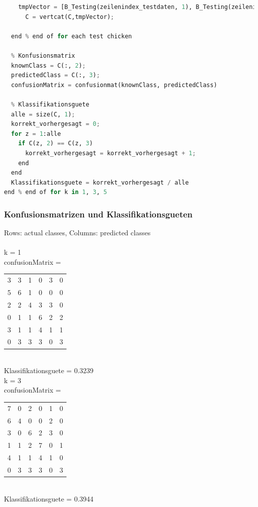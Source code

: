 \documentclass[12pt]{article}
\begin{document}
\begin{lstlisting}[language=Python]
    % Ergebnismatrix C: 1. Spalte: Gewicht, 2. Spalte: Futterklasse (Testdaten), 3. Spalte: Futterklasse (Trainingsdaten)
    tmpVector = [B_Testing(zeilenindex_testdaten, 1), B_Testing(zeilenindex_testdaten, 2), most_frequent_neighbor_class];
      C = vertcat(C,tmpVector);
      
  end % end of for each test chicken
  
  % Konfusionsmatrix
  knownClass = C(:, 2);
  predictedClass = C(:, 3);
  confusionMatrix = confusionmat(knownClass, predictedClass)

  % Klassifikationsguete
  alle = size(C, 1);
  korrekt_vorhergesagt = 0;
  for z = 1:alle
    if C(z, 2) == C(z, 3)
      korrekt_vorhergesagt = korrekt_vorhergesagt + 1;
    end
  end
  Klassifikationsguete = korrekt_vorhergesagt / alle
end % end of for k in 1, 3, 5

\end{lstlisting}
 
\subsubsection{Konfusionsmatrizen und Klassifikationsgueten}
Rows: actual classes, Columns: predicted classes\\
\\
k = 1\\
confusionMatrix =\\
\begin{tabular}{ c c c c c c }
 3 & 3 & 1 & 0 & 3 & 0\\
 5 & 6 & 1 & 0 & 0 & 0\\
 2 & 2 & 4 & 3 & 3 & 0\\
 0 & 1 & 1 & 6 & 2 & 2\\
 3 & 1 & 1 & 4 & 1 & 1\\
 0 & 3 & 3 & 3 & 0 & 3\\
\end{tabular}\\
Klassifikationsguete = 0.3239\\

k = 3\\
confusionMatrix =\\
\begin{tabular}{ c c c c c c }
 7 & 0 & 2 & 0 & 1 & 0\\
 6 & 4 & 0 & 0 & 2 & 0\\
 3 & 0 & 6 & 2 & 3 & 0\\
 1 & 1 & 2 & 7 & 0 & 1\\
 4 & 1 & 1 & 4 & 1 & 0\\
 0 & 3 & 3 & 3 & 0 & 3\\
\end{tabular}\\
Klassifikationsguete = 0.3944\\
\end{document}
